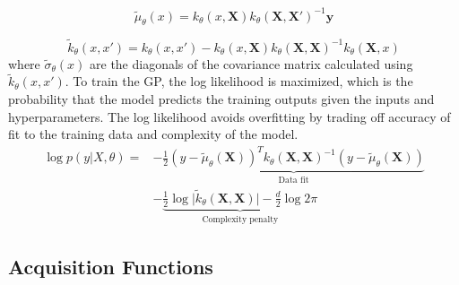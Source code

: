 \begin{equation}
    \tilde \mu_{\theta}(x) = k_{\theta}(x, \mathbf X)k_{\theta}(\mathbf X, \mathbf X')^{-1} \mathbf y
\end{equation}

\begin{equation}
    \tilde k_{\theta}(x,x') = k_{\theta}( x, x')-k_{\theta}(x, \mathbf X) k_{\theta}(\mathbf X, \mathbf X)^{-1}k_{\theta}(\mathbf X, x)
\end{equation}
where $\tilde \sigma_{\theta}(x)$ are the diagonals of the covariance matrix calculated using $\tilde k_{\theta}(x, x')$.
To train the GP, the log likelihood is maximized, which is the probability that the model predicts the training outputs given the inputs and hyperparameters. The log likelihood avoids overfitting by trading off accuracy of fit to the training data and complexity of the model.
\begin{equation}
\begin{split}
    \log p(y \vert X, \theta) = & -\underbrace{\frac{1}{2}(y-\tilde \mu_{\theta}(\mathbf X))^T k_{\theta}(\mathbf X, \mathbf X)^{-1}(y- \tilde\mu_{\theta}(\mathbf X)) }_{\text{Data  fit}} \\
    & - \underbrace{\frac{1}{2} \log{\vert \tilde k_{\theta}(\mathbf X, \mathbf X) \vert} - \frac{d}{2}\log{2 \pi}}_{\text{Complexity penalty}}
\end{split}
\end{equation}

\subsection{Acquisition Functions}

